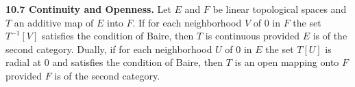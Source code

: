 \textbf{10.7 Continuity and Openness.} Let $E$ and $F$ be linear topological spaces and $T$ an additive map of $E$ into $F$. If for each neighborhood $V$ of $0$ in $F$ the set $T^{-1}[V]$ satisfies the condition of Baire, then $T$ is continuous provided $E$ is of the second category. Dually, if for each neighborhood $U$ of $0$ in $E$ the set $T[U]$ is radial at $0$ and satisfies the condition of Baire, then $T$ is an open mapping onto $F$ provided $F$ is of the second category.
